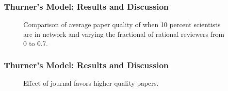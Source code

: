 \documentclass{beamer}
\begin{document}
\begin{frame}
\frametitle{Thurner's Model: Results and Discussion}
\begin{figure}
    \begin{center}
    \caption{Comparison of average paper quality of when 10 percent scientists are in network and varying the fractional of rational reviewers from 0 to 0.7.}
    \end{center}
\end{figure}
\end{frame}

\begin{frame}
\frametitle{Thurner's Model: Results and Discussion}
\begin{figure}
    \begin{center}
    \caption{Effect of journal favors higher quality papers.}
    \end{center}
\end{figure}
\end{frame}
\end{document}
